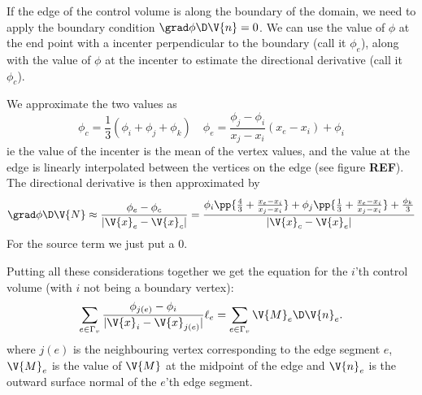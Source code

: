 \documentclass[sigconf]{acmart}
\begin{document}
If the edge of the control volume is along the boundary of the domain, we need to apply the boundary condition $ \grad \phi \D \V{n} = 0$. We can use the value of $ \phi $ at the end point with a incenter perpendicular to the boundary (call it $ \phi_e $), along with the value of $ \phi $ at the incenter to estimate the directional derivative (call it $ \phi_c $).

We approximate the two values as
\begin{equation}\label{key}
	\phi_c = \frac{1}{3} (\phi_i + \phi_j + \phi_k) \quad \phi_e = \frac{\phi_j-\phi_i}{x_j-x_i} (x_e-x_i) + \phi_i 
\end{equation}
ie the value of the incenter is the mean of the vertex values, and the value at the edge is linearly interpolated between the vertices on the edge (see figure \textbf{REF}). The directional derivative is then approximated by
\begin{equation}\label{key}
	\grad\phi \D \V{N} \approx \frac{\phi_e - \phi_c}{|\V{x}_e - \V{x}_c|} = \frac{\phi_i \pp{\frac{4}{3} + \frac{x_e-x_i}{x_j-x_i}} + \phi_j \pp{\frac{1}{3} + \frac{x_e-x_i}{x_j-x_i}} + \frac{\phi_k}{3}}{|\V{x}_c - \V{x}_e|}
\end{equation}
For the source term we just put a 0.


Putting all these considerations together we get the equation for the $ i $'th control volume (with $ i $ not being a boundary vertex):
\begin{equation}\label{key}
	\sum_{e \in \Gamma_v} \frac{\phi_{j(e)}-\phi_i}{|\V{x}_i - \V{x}_{j(e)}|} \ell_e = \sum_{e\in \Gamma_v} \V{M}_e \D \V{n}_e.
\end{equation}
where $ j(e) $ is the neighbouring vertex corresponding to the edge segment $ e $, $ \V{M}_e $ is the value of $ \V{M} $ at the midpoint of the edge and $ \V{n}_e $ is the outward surface normal of the $ e $'th edge segment.
\end{document}
